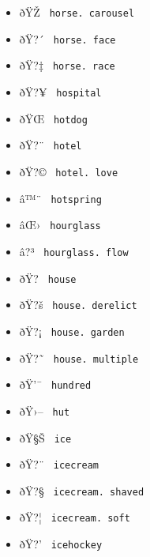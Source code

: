 \begin{itemize}
\item
  \label{symbol-horse.carousel}{{ ðŸŽ }
  \texttt{\ horse.\ carousel\ }}
\item
  \label{symbol-horse.face}{{ ðŸ?´ }
  \texttt{\ horse.\ face\ }}
\item
  \label{symbol-horse.race}{{ ðŸ?‡ }
  \texttt{\ horse.\ race\ }}
\item
  \label{symbol-hospital}{{ ðŸ?¥ } \texttt{\ hospital\ }}
\item
  \label{symbol-hotdog}{{ ðŸŒ­ } \texttt{\ hotdog\ }}
\item
  \label{symbol-hotel}{{ ðŸ?¨ } \texttt{\ hotel\ }}
\item
  \label{symbol-hotel.love}{{ ðŸ?© }
  \texttt{\ hotel.\ love\ }}
\item
  \label{symbol-hotspring}{{ â™¨ }
  \texttt{\ hotspring\ }}
\item
  \label{symbol-hourglass}{{ âŒ› }
  \texttt{\ hourglass\ }}
\item
  \label{symbol-hourglass.flow}{{ â?³ }
  \texttt{\ hourglass.\ flow\ }}
\item
  \label{symbol-house}{{ ðŸ? } \texttt{\ house\ }}
\item
  \label{symbol-house.derelict}{{ ðŸ?š }
  \texttt{\ house.\ derelict\ }}
\item
  \label{symbol-house.garden}{{ ðŸ?¡ }
  \texttt{\ house.\ garden\ }}
\item
  \label{symbol-house.multiple}{{ ðŸ?˜ }
  \texttt{\ house.\ multiple\ }}
\item
  \label{symbol-hundred}{{ ðŸ'¯ } \texttt{\ hundred\ }}
\item
  \label{symbol-hut}{{ ðŸ›-- } \texttt{\ hut\ }}
\item
  \label{symbol-ice}{{ ðŸ§Š } \texttt{\ ice\ }}
\item
  \label{symbol-icecream}{{ ðŸ?¨ } \texttt{\ icecream\ }}
\item
  \label{symbol-icecream.shaved}{{ ðŸ?§ }
  \texttt{\ icecream.\ shaved\ }}
\item
  \label{symbol-icecream.soft}{{ ðŸ?¦ }
  \texttt{\ icecream.\ soft\ }}
\item
  \label{symbol-icehockey}{{ ðŸ?' }
  \texttt{\ icehockey\ }}

\end{itemize}

